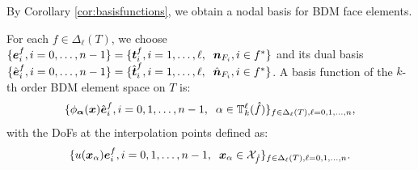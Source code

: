 \documentclass[mathpazo]{cicp}
\begin{document}
By Corollary \ref{cor:basisfunctions}, we obtain a nodal basis for BDM face elements.

\begin{theorem}
For each $f\in \Delta_{\ell}(T)$, we choose $\{\boldsymbol e_i^{f}, i=0,\ldots, n-1\} = \{ \boldsymbol t_i^f, i=1,\ldots, \ell, \; \; \boldsymbol n_{F_i}, i\in f^*\}$ and its dual basis $\{\hat{\boldsymbol e}_i^{f}, i=0,\ldots, n-1\} = \{ \hat{\boldsymbol t}_i^f, i=1,\ldots, \ell, \; \; \hat{\boldsymbol n}_{F_i}, i\in f^*\}$.
A basis function of the $k$-th order BDM element space on $T$ is:
$$
\{\phi_{\boldsymbol\alpha}(\boldsymbol x)\hat{\boldsymbol e}^f_{i},  i=0,1,\ldots, n-1, \; \;  \alpha \in \mathbb T_k^{\ell}(\mathring{f})\}_{f \in \Delta_{\ell}(T), \ell =0,1,\ldots, n},
$$
with the DoFs at the interpolation points defined as:
\begin{align}\label{BDMnodalDoFs}
\{u(\boldsymbol x_{\alpha})\boldsymbol e^f_i,  i=0,1,\ldots, n-1, \; \;  \boldsymbol x_{\alpha} \in \mathcal X_{\mathring{f}} \}_{f \in \Delta_{\ell}(T), \ell =0,1,\ldots, n}.
\end{align}
\end{theorem}


\end{document}
